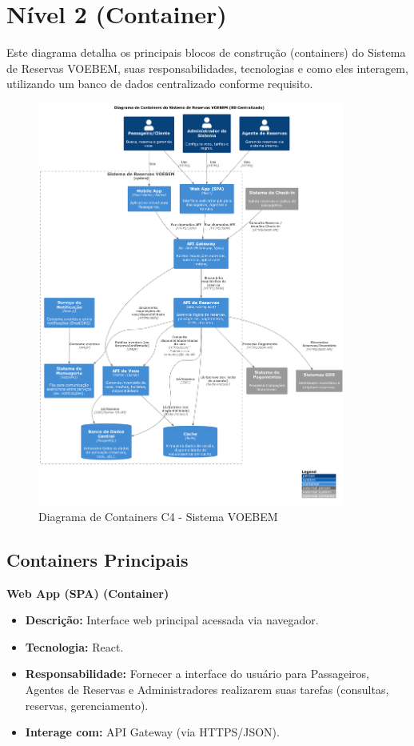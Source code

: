 \section{Nível 2 (Container)}
\label{sec:c4-container}

Este diagrama detalha os principais blocos de construção (containers) do Sistema de Reservas VOEBEM, suas responsabilidades, tecnologias e como eles interagem, utilizando um banco de dados centralizado conforme requisito.

\begin{figure}[htbp]
    \centering
    \includegraphics[width=0.9\textwidth]{../assets/c4-n2-container.pdf}
    \caption{Diagrama de Containers C4 - Sistema VOEBEM}
    \label{fig:c4-container}
\end{figure}

\subsection{Containers Principais}
\label{subsec:c4-container-principais}

\textbf{Web App (SPA) (Container)}
\begin{itemize}
    \item \textbf{Descrição:} Interface web principal acessada via navegador.
    \item \textbf{Tecnologia:} React.
    \item \textbf{Responsabilidade:} Fornecer a interface do usuário para Passageiros, Agentes de Reservas e Administradores realizarem suas tarefas (consultas, reservas, gerenciamento).
    \item \textbf{Interage com:} API Gateway (via HTTPS/JSON).
\end{itemize}

